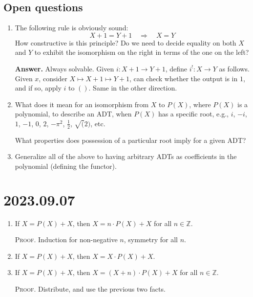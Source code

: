 \documentclass[letterpaper,numbers=enddot]{scrartcl}
\newcommand{\then}{\quad\mathrel{\Longrightarrow}\quad}
\begin{document}
\subsection{Open questions}

\begin{enumerate}
  \item The following rule is obviously sound:
  \[ X+1 = Y+1 \then X=Y \]
  How constructive is this principle?
  Do we need to decide equality on both $X$ and $Y$ to exhibit the
  isomorphism on the right in terms of the one on the left?

  \textbf{Answer.}
  Always solvable.  Given $i : X+1 \to Y+1$, define $i^! :X \to Y$ as follows.
  Given $x$, consider $X \mapsto X+1 \mapsto Y+1$, can check whether the output is in $1$, and if so,
  apply $i$ to $()$.  Same in the other direction.

  \item What does it mean for an isomorphism from $X$ to $P(X)$, where $P(X)$
  is a polynomial, to describe an ADT, when $P(X)$ has a specific root,
  e.g., $i$, $-i$, $1$, $-1$, $0$, $2$, $-\pi^2$, $\frac{1}{2}$, $\sqrt(2)$, etc.

  What properties does possession of a particular root imply for a given ADT?

  \item Generalize all of the above to having arbitrary ADTs as coefficients
  in the polynomial (defining the functor).

\end{enumerate}

\section{2023.09.07}
\begin{enumerate}
  \item If $X = P(X) + X$, then $X = n \cdot P(X) + X$ for all $n \in \mathbb{Z}$.

  \textsc{Proof.} Induction for non-negative $n$, symmetry for all $n$.

  \item If $X = P(X) + X$, then $X = X \cdot P(X) + X$.

  \item If $X = P(X) + X$, then $X = (X+n)\cdot P(X) + X$ for all $n \in \mathbb{Z}$.

  \textsc{Proof.} Distribute, and use the previous two facts.
\end{enumerate}
\end{document}
